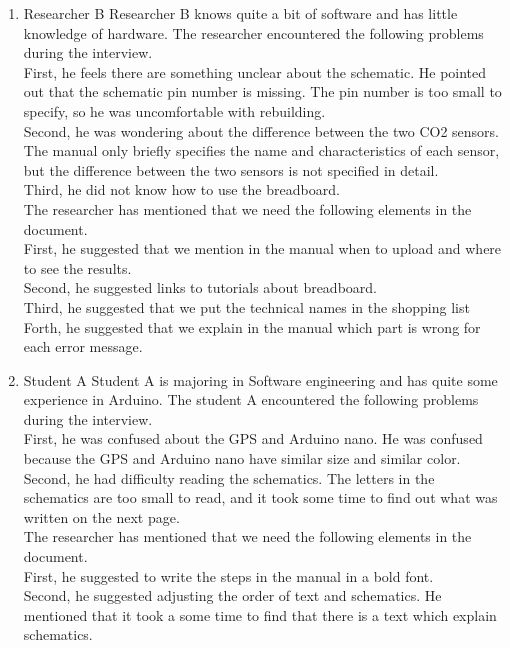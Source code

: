 \documentclass[conference]{IEEEtran}
\begin{document}
\begin{enumerate}
\begin{enumerate}
					\item Researcher B
					Researcher B knows quite a bit of software and has little knowledge of hardware. The researcher encountered the following problems during the interview.\\
					First, he feels there are something unclear about the schematic. 						He pointed out that the schematic pin number is missing. The pin number is too small to specify, so he was uncomfortable with rebuilding.\\
					Second, he was wondering about the difference between the two CO2 sensors. The manual only briefly specifies the name and characteristics of each sensor, but the difference between the two sensors is not specified in detail.\\
					Third, he did not know how to use the breadboard.\\
					The researcher has mentioned that we need the following elements in the document.\\
					First, he suggested that we mention in the manual when to upload and where to see the results. \\
					Second, he suggested links to tutorials about breadboard.\\
					Third, he suggested that we put the technical names in the shopping list\\
					Forth, he suggested that we explain in the manual which part is wrong for each error message.\\
					
					\item Student A
					Student A is majoring in Software engineering and has  quite some experience in Arduino. The student A encountered the following problems during the interview.\\
					First, he was confused about the GPS and Arduino nano. He was confused because the GPS and Arduino nano have similar size and similar color.\\
					Second, he had difficulty reading the schematics. The letters in the schematics are too small to read, and it took some time to find out what was written on the next page.\\
					The researcher has mentioned that we need the following elements in the document.\\
					First, he suggested to write the steps in the manual in a bold font.\\
					Second, he suggested adjusting the order of text and schematics. He mentioned that it took a some time to find that there is a text which explain schematics.
					

\end{enumerate}
\end{enumerate}
\end{document}
